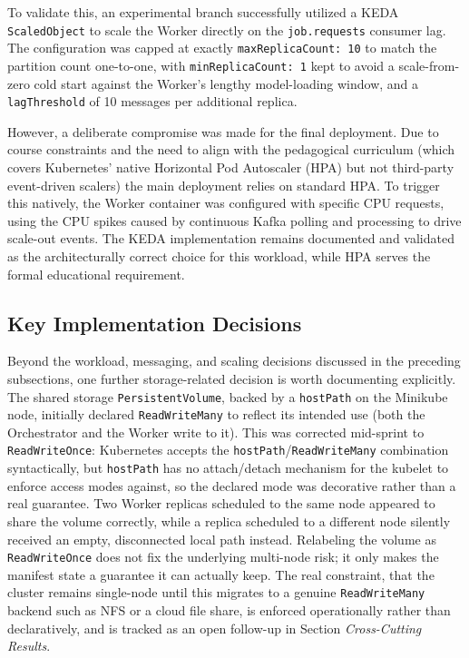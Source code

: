 \documentclass[twoside]{supsistudent}
\begin{document}
To validate this, an experimental branch successfully utilized a KEDA \texttt{ScaledObject} to scale the Worker directly on the \texttt{job.requests} consumer lag. The configuration was capped at exactly \texttt{maxReplicaCount: 10} to match the partition count one-to-one, with \texttt{minReplicaCount: 1} kept to avoid a scale-from-zero cold start against the Worker's lengthy model-loading window, and a \texttt{lagThreshold} of 10 messages per additional replica.

However, a deliberate compromise was made for the final deployment. Due to course constraints and the need to align with the pedagogical curriculum (which covers Kubernetes' native Horizontal Pod Autoscaler (HPA) but not third-party event-driven scalers) the main deployment relies on standard HPA. To trigger this natively, the Worker container was configured with specific CPU requests, using the CPU spikes caused by continuous Kafka polling and processing to drive scale-out events. The KEDA implementation remains documented and validated as the architecturally correct choice for this workload, while HPA serves the formal educational requirement.

\subsection{Key Implementation Decisions}
Beyond the workload, messaging, and scaling decisions discussed in the preceding subsections, one further storage-related decision is worth documenting explicitly. The shared storage \texttt{PersistentVolume}, backed by a \texttt{hostPath} on the Minikube node, initially declared \texttt{ReadWriteMany} to reflect its intended use (both the Orchestrator and the Worker write to it). This was corrected mid-sprint to \texttt{ReadWriteOnce}: Kubernetes accepts the \texttt{hostPath}/\texttt{ReadWriteMany} combination syntactically, but \texttt{hostPath} has no attach/detach mechanism for the kubelet to enforce access modes against, so the declared mode was decorative rather than a real guarantee. Two Worker replicas scheduled to the same node appeared to share the volume correctly, while a replica scheduled to a different node silently received an empty, disconnected local path instead. Relabeling the volume as \texttt{ReadWriteOnce} does not fix the underlying multi-node risk; it only makes the manifest state a guarantee it can actually keep. The real constraint, that the cluster remains single-node until this migrates to a genuine \texttt{ReadWriteMany} backend such as NFS or a cloud file share, is enforced operationally rather than declaratively, and is tracked as an open follow-up in Section \emph{Cross-Cutting Results}.
\end{document}
